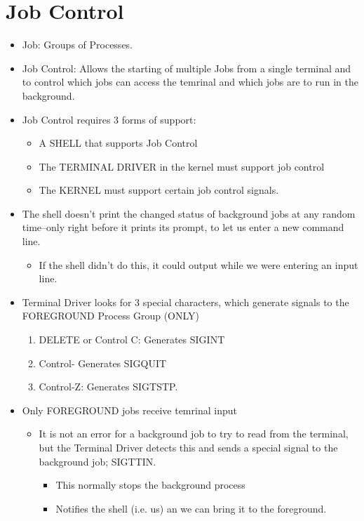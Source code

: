 \documentclass{article}
\begin{document}
\section{Job Control}
\begin{itemize}
\item Job: Groups of Processes.
\item Job Control: Allows the starting of multiple Jobs from a single terminal and to control which jobs can access the temrinal and which jobs are to run in the background.
\item Job Control requires 3 forms of support:
    \begin{itemize}
        \item A SHELL that supports Job Control
        \item The TERMINAL DRIVER in the kernel must support job control
        \item The KERNEL must support certain job control signals.
    \end{itemize}
\item The shell doesn't print the changed status of background jobs at any random time--only right before it prints its prompt, to let us enter a new command line.
    \begin{itemize}
        \item If the shell didn't do this, it could output while we were entering an input line.
    \end{itemize}
\item Terminal Driver looks for 3 special characters, which generate signals to the FOREGROUND Process Group (ONLY)
    \begin{enumerate}
        \item DELETE or Control C: Generates SIGINT
        \item Control-\: Generates SIGQUIT
        \item Control-Z: Generates SIGTSTP.
    \end{enumerate}
\item Only FOREGROUND jobs receive temrinal input
    \begin{itemize}
        \item It is not an error for a background job to try to read from the terminal, but the Terminal Driver detects this and sends a special signal to the background job; SIGTTIN.
            \begin{itemize}
                \item This normally stops the background process
                \item Notifies the shell (i.e. us) an we can bring it to the foreground.
            \end{itemize}
    \end{itemize}
\end{itemize}
\end{document}
